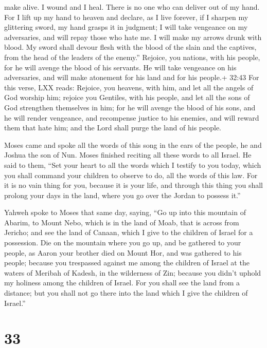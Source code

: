make alive. I wound and I heal. There is no one who can deliver out of
my hand.  For I lift up my hand to heaven and declare, as I
live forever,  if I sharpen my glittering sword, my hand
grasps it in judgment; I will take vengeance on my adversaries, and will
repay those who hate me.  I will make my arrows drunk with
blood. My sword shall devour flesh with the blood of the slain and the
captives, from the head of the leaders of the enemy.'' 
Rejoice, you nations, with his people, for he will avenge the blood of
his servants. He will take vengeance on his adversaries, and will make
atonement for his land and for his people.+ 32:43 For this verse, LXX
reads: Rejoice, you heavens, with him, and let all the angels of God
worship him; rejoice you Gentiles, with his people, and let all the sons
of God strengthen themselves in him; for he will avenge the blood of his
sons, and he will render vengeance, and recompense justice to his
enemies, and will reward them that hate him; and the Lord shall purge
the land of his people.

 Moses came and spoke all the words of this song in the
ears of the people, he and Joshua the son of Nun.  Moses
finished reciting all these words to all Israel.  He said
to them, ``Set your heart to all the words which I testify to you today,
which you shall command your children to observe to do, all the words of
this law.  For it is no vain thing for you, because it is
your life, and through this thing you shall prolong your days in the
land, where you go over the Jordan to possess it.''

 Yahweh spoke to Moses that same day, saying, 
``Go up into this mountain of Abarim, to Mount Nebo, which is in the
land of Moab, that is across from Jericho; and see the land of Canaan,
which I give to the children of Israel for a possession. 
Die on the mountain where you go up, and be gathered to your people, as
Aaron your brother died on Mount Hor, and was gathered to his people;
 because you trespassed against me among the children of
Israel at the waters of Meribah of Kadesh, in the wilderness of Zin;
because you didn't uphold my holiness among the children of Israel.
 For you shall see the land from a distance; but you shall
not go there into the land which I give the children of Israel.''

\hypertarget{section-32}{%
\section{33}\label{section-32}}


